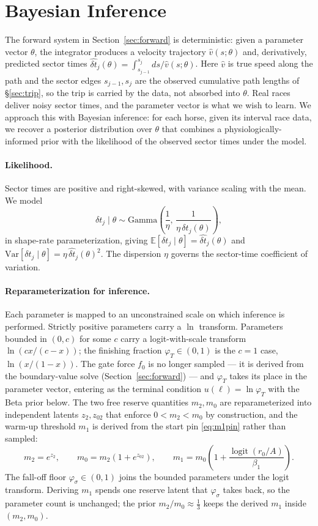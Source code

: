 \documentclass[11pt]{article}
\begin{document}
\section{Bayesian Inference}\label{sec:inference}

The forward system in Section~\ref{sec:forward} is deterministic: given a parameter vector $\theta$, the integrator produces a velocity trajectory $\hat v(s; \theta)$ and, derivatively, predicted sector times $\hat{\delta t}_j(\theta) = \int_{s_{j-1}}^{s_j} ds/\hat v(s; \theta)$. Here $\hat v$ is true speed along the path and the sector edges $s_{j-1}, s_j$ are the observed cumulative path lengths of \S\ref{sec:trip}, so the trip is carried by the data, not absorbed into $\theta$. Real races deliver noisy sector times, and the parameter vector is what we wish to learn. We approach this with Bayesian inference: for each horse, given its interval race data, we recover a posterior distribution over $\theta$ that combines a physiologically-informed prior with the likelihood of the observed sector times under the model.

\paragraph{Likelihood.} Sector times are positive and right-skewed, with variance scaling with the mean. We model
\[
\delta t_j \mid \theta \sim \text{Gamma}\!\left(\frac{1}{\eta},\, \frac{1}{\eta\, \hat{\delta t}_j(\theta)}\right),
\]
in shape-rate parameterization, giving $\mathbb{E}[\delta t_j \mid \theta] = \hat{\delta t}_j(\theta)$ and $\text{Var}[\delta t_j \mid \theta] = \eta\, \hat{\delta t}_j(\theta)^2$. The dispersion $\eta$ governs the sector-time coefficient of variation.

\paragraph{Reparameterization for inference.} Each parameter is mapped to an unconstrained scale on which inference is performed. Strictly positive parameters carry a $\ln$ transform. Parameters bounded in $(0, c)$ for some $c$ carry a logit-with-scale transform $\ln(c x / (c - x))$; the finishing fraction $\varphi_T \in (0, 1)$ is the $c = 1$ case, $\ln(x/(1-x))$. The gate force $f_0$ is no longer sampled --- it is derived from the boundary-value solve (Section~\ref{sec:forward}) --- and $\varphi_T$ takes its place in the parameter vector, entering as the terminal condition $u(\ell) = \ln \varphi_T$ with the Beta prior below. The two free reserve quantities $m_2, m_0$ are reparameterized into independent latents $z_2, z_{02}$ that enforce $0 < m_2 < m_0$ by construction, and the warm-up threshold $m_1$ is derived from the start pin \eqref{eq:m1pin} rather than sampled:
\[
m_2 = e^{z_2}, \qquad m_0 = m_2(1 + e^{z_{02}}), \qquad m_1 = m_0\!\left(1 + \frac{\operatorname{logit}(r_0/A)}{\beta_1}\right).
\]
The fall-off floor $\varphi_\sigma \in (0, 1)$ joins the bounded parameters under the logit transform. Deriving $m_1$ spends one reserve latent that $\varphi_\sigma$ takes back, so the parameter count is unchanged; the prior $m_2/m_0 \approx \tfrac13$ keeps the derived $m_1$ inside $(m_2, m_0)$.
\end{document}
